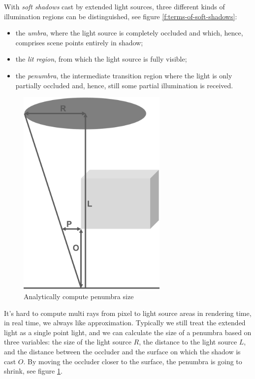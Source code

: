 With \textit{soft shadows} cast by extended light sources, three different kinds of illumination regions can be distinguished, see figure \ref{f:terms-of-soft-shadows}:

\begin{itemize}
	\item the \textit{umbra}, where the light source is completely occluded and which, hence, comprises scene points entirely in shadow;
	\item the \textit{lit region}, from which the light source is fully visible;
	\item the \textit{penumbra}, the intermediate transition region where the light is only partially occluded and, hence, still some partial illumination is received. 
\end{itemize}

\begin{figure}
\sidecaption
	\includegraphics[width=0.65\textwidth]{graphics/shadows/penumbra-size-calculation}
	\caption{Analytically compute penumbra size}
	\label{f:penumbra-size-calculation}
\end{figure} 

It's hard to compute multi rays from pixel to light source areas in rendering time, in real time, we always like approximation. Typically we still treat the extended light as a single point light, and we can calculate the size of a penumbra based on three variables: the size of the light source $R$, the distance to the light source $L$, and the distance between the occluder and the surface on which the shadow is cast $O$. By moving the occluder closer to the surface, the penumbra is going to shrink, see figure \ref{f:penumbra-size-calculation}.


